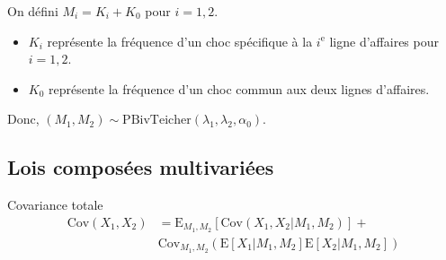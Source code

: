 \documentclass[10pt, french]{article}
\begin{document}
\begin{multicols*}{2}
\begin{definitionNOHFILL}
On défini $M_{i}	=	K_{i} + K_{0}$ pour $i	=	1, 2$.
\begin{itemize}
	\item	$K_{i}$ représente la fréquence d'un \og choc \fg{} spécifique à la $i^{\text{e}}$ ligne d'affaires pour $i = 1, 2$.
	\item	$K_{0}$ représente la fréquence d'un \og choc \fg{} commun aux deux lignes d'affaires.
\end{itemize}

Donc, $(M_{1}, M_{2})	\sim \text{PBivTeicher}(\lambda_{1}, \lambda_{2}, \alpha_{0})$.
\end{definitionNOHFILL}



\columnbreak
\subsection{Lois composées multivariées}
%
%

\begin{rappel}{Covariance totale}
\setlength{\mathindent}{-1cm}
\begin{align*}
    \text{Cov}(X_{1}, X_{2})
    &=  \text{E}_{M_{1}, M_{2}}\left[\text{Cov}(X_{1}, X_{2} | M_{1}, M_{2})\right] + \\ &\text{Cov}_{M_{1}, M_{2}}\left( \text{E}\left[X_{1}| M_{1}, M_{2}\right]\text{E}\left[X_{2}| M_{1}, M_{2}\right]\right)
\end{align*}
\setlength{\mathindent}{1cm}
\end{rappel}



\end{multicols*}
\end{document}
